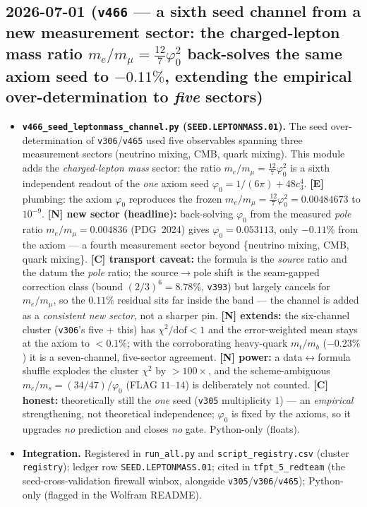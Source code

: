 \documentclass[11pt]{article}
\begin{document}
\subsection*{2026-07-01 (\texttt{v466} --- a sixth seed channel from a new measurement sector: the charged-lepton mass ratio $m_e/m_\mu{=}\tfrac{12}{7}\varphi_0^2$ back-solves the same axiom seed to $-0.11\%$, extending the empirical over-determination to \emph{five} sectors)}
\begin{itemize}
\item \textbf{\texttt{v466\_seed\_leptonmass\_channel.py} (\texttt{SEED.LEPTONMASS.01}).} The seed
over-determination of \texttt{v306}/\texttt{v465} used five observables spanning three measurement
sectors (neutrino mixing, CMB, quark mixing). This module adds the \emph{charged-lepton mass} sector:
the ratio $m_e/m_\mu{=}\tfrac{12}{7}\varphi_0^2$ is a sixth independent readout of the \emph{one} axiom
seed $\varphi_0{=}1/(6\pi){+}48c_3^4$. \textbf{[E]} plumbing: the axiom $\varphi_0$ reproduces the frozen
$m_e/m_\mu{=}\tfrac{12}{7}\varphi_0^2{=}0.00484673$ to $10^{-9}$. \textbf{[N] new sector (headline):}
back-solving $\varphi_0$ from the measured \emph{pole} ratio $m_e/m_\mu{=}0.004836$ (PDG~2024) gives
$\varphi_0{=}0.053113$, only $-0.11\%$ from the axiom --- a fourth measurement sector beyond
\{neutrino mixing, CMB, quark mixing\}. \textbf{[C] transport caveat:} the formula is the \emph{source}
ratio and the datum the \emph{pole} ratio; the source$\to$pole shift is the seam-gapped correction class
(bound $(2/3)^6{=}8.78\%$, \texttt{v393}) but largely cancels for $m_e/m_\mu$, so the $0.11\%$ residual sits
far inside the band --- the channel is added as a \emph{consistent new sector}, not a sharper pin.
\textbf{[N] extends:} the six-channel cluster (\texttt{v306}'s five $+$ this) has $\chi^2/\mathrm{dof}{<}1$
and the error-weighted mean stays at the axiom to ${<}0.1\%$; with the corroborating heavy-quark
$m_t/m_b$ ($-0.23\%$) it is a seven-channel, five-sector agreement. \textbf{[N] power:} a
data$\leftrightarrow$formula shuffle explodes the cluster $\chi^2$ by ${>}100\times$, and the
scheme-ambiguous $m_c/m_s{=}(34/47)/\varphi_0$ (FLAG $11$--$14$) is deliberately not counted.
\textbf{[C] honest:} theoretically still the \emph{one} seed (\texttt{v305} multiplicity $1$) --- an
\emph{empirical} strengthening, not theoretical independence; $\varphi_0$ is fixed by the axioms, so it
upgrades \emph{no} prediction and closes \emph{no} gate. Python-only (floats).
\item \textbf{Integration.} Registered in \texttt{run\_all.py} and \texttt{script\_registry.csv}
(cluster \texttt{registry}); ledger row \texttt{SEED.LEPTONMASS.01}; cited in \texttt{tfpt\_5\_redteam}
(the seed-cross-validation firewall winbox, alongside \texttt{v305}/\texttt{v306}/\texttt{v465});
Python-only (flagged in the Wolfram README).
\end{itemize}
\end{document}
